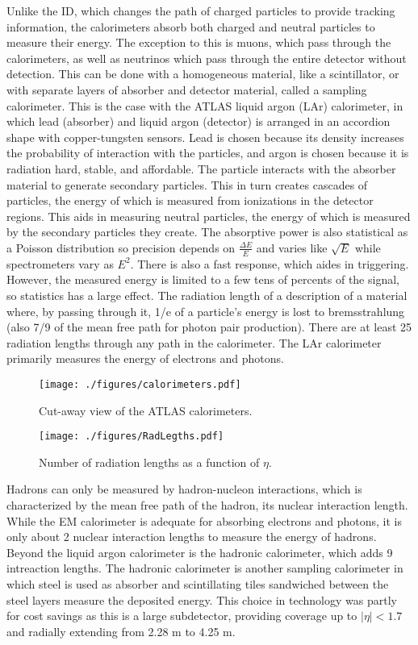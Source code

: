Unlike the ID, which changes the path of charged particles to provide tracking information, the calorimeters absorb both charged and neutral particles to measure their energy.  The exception to this is muons, which pass through the calorimeters, as well as neutrinos which pass through the entire detector without detection.  This can be done with a homogeneous material, like a scintillator, or with separate layers of absorber and detector material, called a sampling calorimeter.  This is the case with the ATLAS liquid argon (LAr) calorimeter, in which lead (absorber) and liquid argon (detector) is arranged in an accordion shape with copper-tungsten sensors.  Lead is chosen because its density increases the probability of interaction with the particles, and argon is chosen because it is radiation hard, stable, and affordable.  The particle interacts with the absorber material to generate secondary particles.  This in turn creates cascades of particles, the energy of which is measured from ionizations in the detector regions.  This aids in measuring neutral particles, the energy of which is measured by the secondary particles they create.  The absorptive power is also statistical as a Poisson distribution so precision depends on $\frac{\Delta E}{E}$ and varies like $\sqrt{E}$ while spectrometers vary as $E^{2}$.  There is also a fast response, which aides in triggering.  However, the measured energy is limited to a few tens of percents of the signal, so statistics has a large effect.  The radiation length of a description of a material where, by passing through it, 1/e of a particle's energy is lost to bremsstrahlung (also 7/9 of the mean free path for photon pair production).  There are at least 25 radiation lengths through any path in the calorimeter.  The LAr calorimeter primarily measures the energy of electrons and photons.

\begin{figure}[h!]
  \centering
	\texttt{[image: ./figures/calorimeters.pdf]}
\caption{\label{fig:calorimeters}{ Cut-away view of the ATLAS calorimeters. }} %
\end{figure}

\begin{figure}[h!]
  \centering
	\texttt{[image: ./figures/RadLegths.pdf]}
\caption{\label{fig:radLengths}{ Number of radiation lengths as a function of $\eta$. }} %
\end{figure}


Hadrons can only be measured by hadron-nucleon interactions, which is characterized by the mean free path of the hadron, its nuclear interaction length.  While the EM calorimeter is adequate for absorbing electrons and photons, it is only about 2 nuclear interaction lengths to measure the energy of hadrons.  Beyond the liquid argon calorimeter is the hadronic calorimeter, which adds 9 intreaction lengths.  The hadronic calorimeter is another sampling calorimeter in which steel is used as absorber and scintillating tiles sandwiched between the steel layers measure the deposited energy.  This choice in technology was partly for cost savings as this is a large subdetector, providing coverage up to $|\eta|<1.7$ and radially extending from 2.28 m to 4.25 m.  

